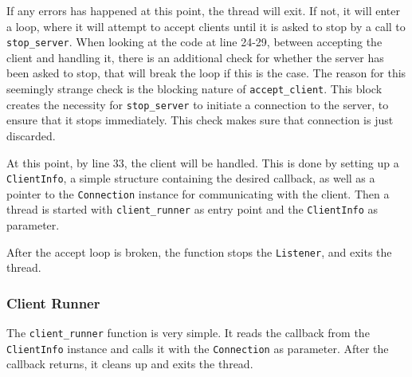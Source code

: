 If any errors has happened at this point, the thread will exit. If not, it will enter a loop, where it will attempt to accept clients until it is asked to stop by a call to \lstinline|stop_server|.
When looking at the code at line 24-29, between accepting the client and handling it, there is an additional check for whether the server has been asked to stop, that will break the loop
if this is the case. The reason for this seemingly strange check is the blocking nature of \lstinline|accept_client|. This block creates the necessity for \lstinline|stop_server| to initiate
a connection to the server, to ensure that it stops immediately. This check makes sure that connection is just discarded.

At this point, by line 33, the client will be handled. This is done by setting up a \lstinline|ClientInfo|, a simple structure containing the desired callback,
as well as a pointer to the \lstinline|Connection| instance for communicating with the client.
Then a thread is started with \lstinline|client_runner| as entry point and the \lstinline|ClientInfo| as parameter.

After the accept loop is broken, the function stops the \lstinline|Listener|, and exits the thread.



\subsubsection{Client Runner}
The \lstinline|client_runner| function is very simple. It reads the callback from the \lstinline|ClientInfo| instance and calls it with the \lstinline|Connection| as parameter.
After the callback returns, it cleans up and exits the thread.